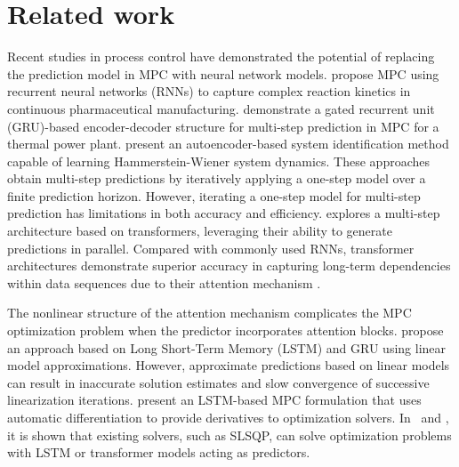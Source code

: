 \documentclass{ifacconf}
\begin{document}
\section{Related work}\label{sec:RW}

Recent studies in process control have demonstrated the potential of replacing the prediction model in MPC with neural network models. \citet{wong2018recurrentneuralnetworkbasedmodel} propose MPC using recurrent neural networks (RNNs) to capture complex reaction kinetics in continuous pharmaceutical manufacturing. \citet{MACHALEK2022100172} demonstrate a gated recurrent unit (GRU)-based encoder-decoder structure for multi-step prediction in MPC for a thermal power plant. \citet{MASTI2021109666} present an autoencoder-based system identification method capable of learning Hammerstein-Wiener system dynamics. These approaches obtain multi-step predictions by iteratively applying a one-step model over a finite prediction horizon. However, iterating a one-step model for multi-step prediction has limitations in both accuracy and efficiency. \citet{PARK2023108396} explores a multi-step architecture based on transformers, leveraging their ability to generate predictions in parallel. Compared with commonly used RNNs, transformer architectures demonstrate superior accuracy in capturing long-term dependencies within data sequences due to their attention mechanism  \citep{10.5555/3295222.3295349}. %

The nonlinear structure of the attention mechanism complicates the MPC optimization problem when the predictor incorporates attention blocks. \citet{ZARZYCKI2022229} propose an approach based on Long Short-Term Memory (LSTM) and GRU using linear model approximations. However, approximate predictions based on linear models can result in inaccurate solution estimates and slow convergence of successive linearization iterations. \citet{JUNG2023106226} present an LSTM-based MPC formulation that uses automatic differentiation to provide derivatives to optimization solvers. In~\cite{PARK2023108396} and \cite{JUNG2023106226}, it is shown that existing solvers, such as SLSQP, can solve optimization problems with LSTM or transformer models acting as predictors. 
\end{document}
